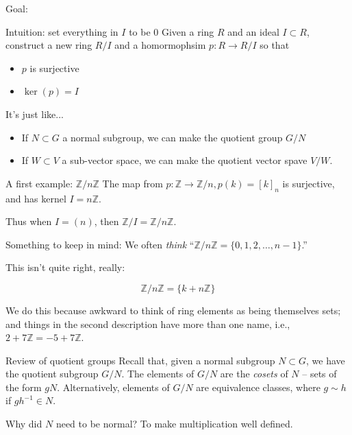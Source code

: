 \documentclass{beamer}
\begin{document}
\begin{frame}{Goal:}
\begin{block}{Intuition: set everything in $I$ to be 0}
  Given a ring $R$ and an ideal $I\subset R$, construct a new ring $R/I$ and a homormophsim $p:R\to R/I$ so that
  \begin{itemize}
  \item $p$ is surjective
  \item $\ker(p)=I$
  \end{itemize}
  \end{block}
  \begin{block}{It's just like...}
    \begin{itemize}
    \item If $N\subset G$ a normal subgroup, we can make the quotient group $G/N$
      \item If $W\subset V$ a sub-vector space, we can make the quotient vector spave $V/W$.
    \end{itemize}
\end{block}
  \end{frame}

\begin{frame}{A first example: $\mathbb{Z}/n\mathbb{Z}$}
The map from $p:\mathbb{Z}\to\mathbb{Z}/n, p(k)=[k]_n$ is surjective, and has kernel $I=n\mathbb{Z}$.  

Thus when $I=(n)$, then $\mathbb{Z}/I=\mathbb{Z}/n\mathbb{Z}$.

\begin{block}{Something to keep in mind:}
We often \emph{think} ``$\mathbb{Z}/n\mathbb{Z}=\{0,1,2,\dots, n-1\}$.''

This isn't quite right, really:

$$\mathbb{Z}/n\mathbb{Z}=\{k+n\mathbb{Z} \}$$

We do this because awkward to think of ring elements as being themselves sets; and things in the second description have more than one name, i.e., $2+7\mathbb{Z}=-5+7\mathbb{Z}$.

\end{block}


\end{frame}


\begin{frame}{Review of quotient groups}
Recall that, given a normal subgroup $N \subset  G$, we have the quotient subgroup $G/N$.  The elements of $G/N$ are the \emph{cosets} of $N$ -- sets of the form $gN$.  Alternatively, elements of $G/N$ are equivalence classes, where $g\sim h$ if $gh^{-1}\in N$.

\begin{block}{Why did $N$ need to be normal?}
To make multiplication well defined.

\end{block}

\end{frame}
\end{document}
